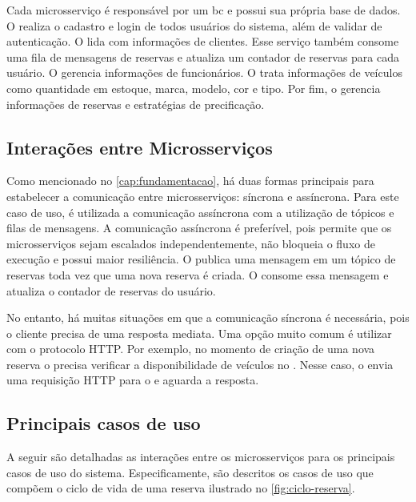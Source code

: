 Cada microsserviço é responsável por um \acrshort{bc} e possui sua própria base de dados. O  realiza o cadastro e login de todos usuários do sistema, além de validar  de autenticação. O  lida com informações de clientes. Esse serviço também consome uma fila de mensagens de reservas e atualiza um contador de reservas para cada usuário. O  gerencia informações de funcionários. O  trata informações de veículos como quantidade em estoque, marca, modelo, cor e tipo. Por fim, o  gerencia informações de reservas e estratégias de precificação.

\subsection{Interações entre Microsserviços}
Como mencionado no \autoref{cap:fundamentacao}, há duas formas principais para estabelecer a comunicação entre microsserviços: síncrona e assíncrona. Para este caso de uso, é utilizada a comunicação assíncrona com a utilização de tópicos e filas de mensagens. A comunicação assíncrona é preferível, pois permite que os microsserviços sejam escalados independentemente, não bloqueia o fluxo de execução e possui maior resiliência. O  publica uma mensagem em um tópico de reservas toda vez que uma nova reserva é criada. O  consome essa mensagem e atualiza o contador de reservas do usuário.

No entanto, há muitas situações em que a comunicação síncrona é necessária, pois o cliente precisa de uma resposta mediata. Uma opção muito comum é utilizar  com o protocolo HTTP. Por exemplo, no momento de criação de uma nova reserva o  precisa verificar a disponibilidade de veículos no . Nesse caso, o  envia uma requisição HTTP para o  e aguarda a resposta.

\subsection{Principais casos de uso}
A seguir são detalhadas as interações entre os microsserviços para os principais casos de uso do sistema. Especificamente, são descritos os casos de uso que compõem o ciclo de vida de uma reserva ilustrado no \autoref{fig:ciclo-reserva}.

